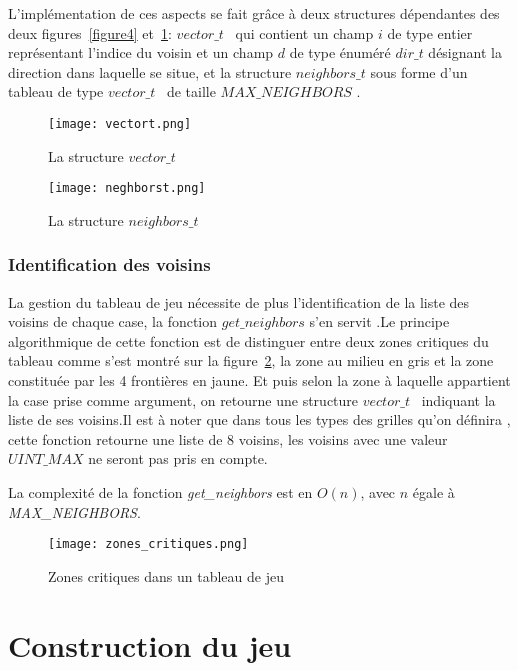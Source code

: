 \documentclass[11pt]{article}
\begin{document}
                L'implémentation de ces aspects se fait grâce à deux structures dépendantes des deux figures~\ref{figure4} et~\ref{figure5}: $vector\_t$ \ qui contient un champ $i$ de type entier représentant l'indice du voisin et un champ $d$ de type énuméré $dir\_t$ désignant la direction dans laquelle se situe, et la structure $neighbors\_t$ sous forme d'un tableau de type $vector\_t$ \ de taille $MAX\_NEIGHBORS$ . 
                \begin{figure}[h]
                \centering
                \texttt{[image: vectort.png]}
                \caption{La structure $vector\_t$}
                \label{figure4}
                \texttt{[image: neghborst.png]}
                \caption{La structure $neighbors\_t$}
                \label{figure5}
                \end{figure}
            \subsubsection {Identification des voisins }
                La gestion du tableau de jeu nécessite de plus l'identification de la liste des voisins de chaque case, la fonction $get\_neighbors$ s'en servit .Le principe algorithmique de cette fonction est de distinguer entre deux zones critiques du tableau comme s'est montré sur la figure~\ref{figure6}, la zone au milieu en gris et la zone constituée par les 4 frontières en jaune. Et puis selon la zone à laquelle appartient la case prise comme argument, on retourne une structure $vector\_t$ \ indiquant la liste de ses voisins.Il est à noter que dans tous les types des grilles qu'on définira , cette fonction retourne une liste de 8 voisins, les voisins avec une valeur $UINT\_MAX$ ne seront pas pris en compte.

                La complexité de la fonction \textit{get\_neighbors} est en $O(n)$, avec $n$ égale à \textit{MAX\_NEIGHBORS}.
                \begin{figure}[h]
                \centering
                \texttt{[image: zones\_critiques.png]}
                \caption{Zones critiques dans un tableau de jeu}
                \label{figure6}
                \end{figure}
                \newpage
            
    \section{Construction du jeu}
\end{document}
